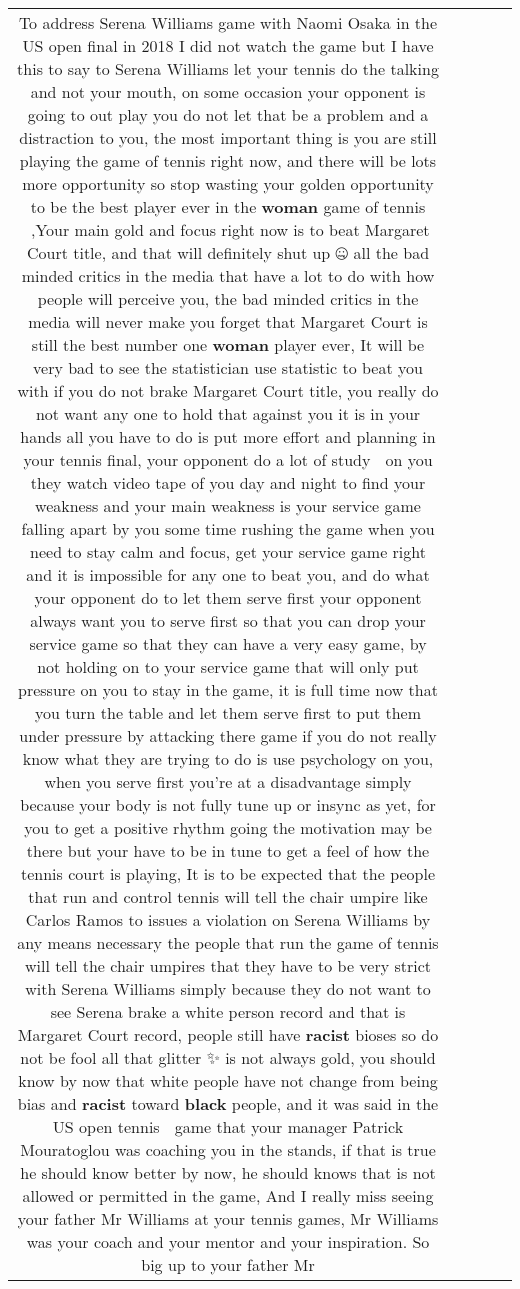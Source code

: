 \documentclass[11pt]{article}
\newlength\mylength
\begin{document}
\begin{center}
\begin{longtable}{|C{.65\mylength}|C{.30\mylength}|C{.12\mylength}|C{.12\mylength}|C{.12\mylength}|}
  \small To address Serena Williams game  with Naomi Osaka in the US open final in 2018 I did not watch the game but I have this to say to Serena Williams let your tennis do the talking and not your mouth, on some occasion your opponent is going to out play you do not let that be a problem and a distraction to you, the most important thing is you are still playing the game of tennis right now, and there will be lots more opportunity so stop wasting your golden opportunity to be the best player ever in the \textbf{woman} game of tennis 🎾,Your main gold and focus right now is to beat Margaret Court title, and that will definitely shut up 🤐 all the bad minded critics in the media that have a lot to do with how people will perceive you, the bad minded critics in the media will never make you forget that Margaret Court is still the best number one \textbf{woman} player ever, It will be very bad to see the statistician use statistic to beat you with if you do not brake Margaret Court title, you really do not want any one to hold that against you it is in your hands all you have to do is put more effort and planning in your tennis final, your opponent do a lot of study 📖 on you they watch video tape of you day and night to find your weakness and your main weakness is your service game falling apart by you some time rushing the game when you need to stay calm and  focus, get your service game right and it is impossible for any one to beat you, and do what your opponent do to let them serve first your opponent always want you to serve first so that you can drop your service game so that they can have a very easy game, by not holding on to your service game that will only put pressure on you to stay in the game, it is full time now that you turn the table and let them serve first to put them under pressure by attacking there game if you do not really know what they are trying to do is use psychology on you, when you serve first you're at a disadvantage simply because your body is not fully tune up or insync as yet, for you to get a positive rhythm going the motivation may be there but your have to be in tune to get a feel of how the tennis court is playing, It is to be expected that the people that run and control tennis will tell the chair umpire like Carlos Ramos to issues a violation on Serena Williams by any means necessary the people that run the game of tennis will tell the chair umpires that they have to be very strict with Serena Williams simply because they do not want to see Serena brake a white person record and that is  Margaret Court record, people still have \textbf{racist} bioses so do not be fool all that glitter ✨ is not always gold, you should know by now that white people have not change from being bias and \textbf{racist} toward \textbf{black} people, and it was said in the US open tennis 🎾 game that your manager Patrick Mouratoglou was coaching you in the stands, if that is true he should know better by now, he should knows that is not allowed or permitted in the game, And I really miss seeing your father Mr Williams at your tennis games, Mr Williams was your coach and your mentor and your inspiration. So big up to your father Mr 
\end{longtable}
\end{center}
\end{document}

